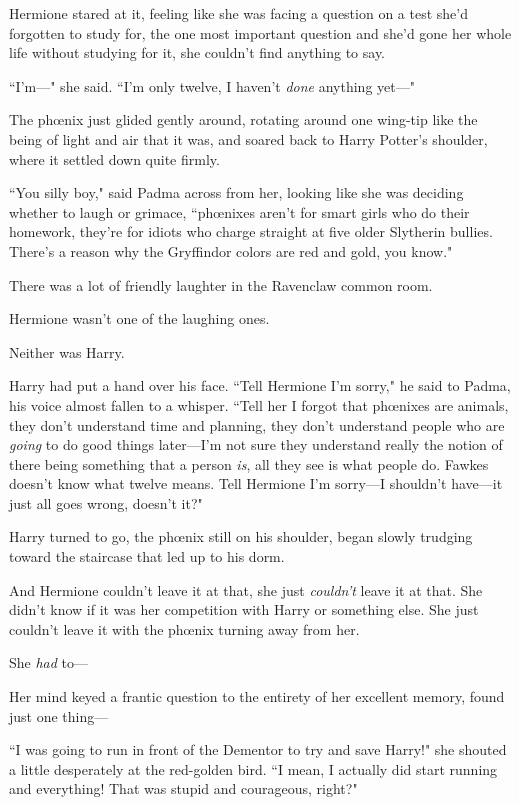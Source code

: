 Hermione stared at it, feeling like she was facing a question on a test she'd forgotten to study for, the one most important question and she'd gone her whole life without studying for it, she couldn't find anything to say.

``I'm—" she said. ``I'm only twelve, I haven't \emph{done} anything yet—"

The phœnix just glided gently around, rotating around one wing-tip like the being of light and air that it was, and soared back to Harry Potter's shoulder, where it settled down quite firmly.

``You silly boy," said Padma across from her, looking like she was deciding whether to laugh or grimace, ``phœnixes aren't for smart girls who do their homework, they're for idiots who charge straight at five older Slytherin bullies. There's a reason why the Gryffindor colors are red and gold, you know."

There was a lot of friendly laughter in the Ravenclaw common room.

Hermione wasn't one of the laughing ones.

Neither was Harry.

Harry had put a hand over his face. ``Tell Hermione I'm sorry," he said to Padma, his voice almost fallen to a whisper. ``Tell her I forgot that phœnixes are animals, they don't understand time and planning, they don't understand people who are \emph{going} to do good things later—I'm not sure they understand really the notion of there being something that a person \emph{is}, all they see is what people do. Fawkes doesn't know what twelve means. Tell Hermione I'm sorry—I shouldn't have—it just all goes wrong, doesn't it?"

Harry turned to go, the phœnix still on his shoulder, began slowly trudging toward the staircase that led up to his dorm.

And Hermione couldn't leave it at that, she just \emph{couldn't} leave it at that. She didn't know if it was her competition with Harry or something else. She just couldn't leave it with the phœnix turning away from her.

She \emph{had} to—

Her mind keyed a frantic question to the entirety of her excellent memory, found just one thing—

``I was going to run in front of the Dementor to try and save Harry!" she shouted a little desperately at the red-golden bird. ``I mean, I actually did start running and everything! That was stupid and courageous, right?"


